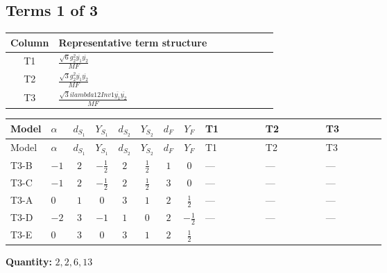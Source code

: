 \documentclass[8pt]{article}
\begin{document}
\begin{landscape}
\subsection*{Terms 1 of 3}
\begin{center}
\begin{tabular}{@{}c >{\raggedright\arraybackslash}p{0.82\linewidth}@{}}
\toprule
Column & Representative term structure \\
\midrule
T1 & \(\displaystyle \frac{\sqrt{6} g_{2}^{2} \overline{y_{1}} \overline{y_{2}}}{MF}\) \\
\midrule
T2 & \(\displaystyle \frac{\sqrt{3} g_{2}^{2} \overline{y_{1}} \overline{y_{2}}}{MF}\) \\
\midrule
T3 & \(\displaystyle \frac{\sqrt{3} i lambda12Inv1 \overline{y_{1}} \overline{y_{2}}}{MF}\) \\
\midrule
\bottomrule
\end{tabular}
\end{center}
\smallskip
\tiny
\begin{longtable}{@{}llcccccc >{\raggedright\arraybackslash}p{0.21\linewidth} >{\raggedright\arraybackslash}p{0.21\linewidth} >{\raggedright\arraybackslash}p{0.21\linewidth}@{}}
\toprule
Model & $\alpha$ & $d_{S_1}$ & $Y_{S_1}$ & $d_{S_2}$ & $Y_{S_2}$ & $d_F$ & $Y_F$ & T1 & T2 & T3 \\
\midrule
\endfirsthead
\toprule
Model & $\alpha$ & $d_{S_1}$ & $Y_{S_1}$ & $d_{S_2}$ & $Y_{S_2}$ & $d_F$ & $Y_F$ & T1 & T2 & T3 \\
\midrule
\endhead
T3-B & $-1$ & $2$ & $-\frac{1}{2}$ & $2$ & $\frac{1}{2}$ & $1$ & $0$ & --- & --- & --- \\
\midrule
T3-C & $-1$ & $2$ & $-\frac{1}{2}$ & $2$ & $\frac{1}{2}$ & $3$ & $0$ & --- & --- & --- \\
\midrule
T3-A & $0$ & $1$ & $0$ & $3$ & $1$ & $2$ & $\frac{1}{2}$ & --- & --- & --- \\
\midrule
T3-D & $-2$ & $3$ & $-1$ & $1$ & $0$ & $2$ & $-\frac{1}{2}$ & --- & --- & --- \\
\midrule
T3-E & $0$ & $3$ & $0$ & $3$ & $1$ & $2$ & $\frac{1}{2}$ & \scriptsize\adjustbox{max width=\linewidth}{$\begin{gathered} \frac{\sqrt{6} g_{2}^{2} \overline{y_{1}} \overline{y_{2}}}{3 MF}\end{gathered}$} & \scriptsize\adjustbox{max width=\linewidth}{$\begin{gathered} \frac{\sqrt{3} g_{2}^{2} \overline{y_{1}} \overline{y_{2}}}{6 MF}\end{gathered}$} & \scriptsize\adjustbox{max width=\linewidth}{$\begin{gathered} - \frac{\sqrt{3} i lambda12Inv1 \overline{y_{1}} \overline{y_{2}}}{6 MF}\end{gathered}$} \\
\midrule
\bottomrule
\end{longtable}
\clearpage
\noindent\textbf{Quantity: }$\mathrm{2,2,6,13}$\par\smallskip

\end{landscape}
\end{document}

